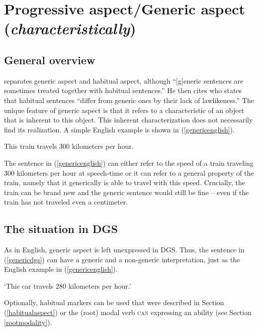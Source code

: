 \section{Progressive aspect/Generic aspect (\textit{characteristically})}\label{characteristic}
\subsection{General overview}
\citet[99]{cinque1999adverbs} separates generic aspect and habitual aspect, although ``$[$g$]$eneric sentences are sometimes treated together with habitual sentences.'' He then cites \citet[97]{dahl1985tense} who states that habitual sentences ``differ from generic ones by their lack of lawlikeness.'' The unique feature of generic aspect is that it refers to a characteristic of an object that is inherent to this object. This inherent characterization does not necessarily find its realization. A simple English example is shown in (\ref{genericenglish}).

\begin{exe}
\ex This train travels 300 kilometers per hour. \label{genericenglish}
\end{exe} 

\noindent The sentence in (\ref{genericenglish}) can either refer to the speed of a train traveling 300 kilometers per hour at speech-time or it can refer to a general property of the train, namely that it generically is able to travel with this speed. Crucially, the train can be brand new and the generic sentence would still be fine -- even if the train has not traveled even a centimeter. 

\subsection{The situation in DGS}
As in English, generic aspect is left unexpressed in DGS. Thus, the sentence in (\ref{genericdgs}) can have a generic and a non-generic interpretation, just as the English example in (\ref{genericenglish}).


\begin{exe}
\glt `This car travels 280 kilometers per hour.'\label{genericdgs}
\end{exe} 

\noindent Optionally, habitual markers can be used that were described in Section (\ref{habitualaspect}) or the (root) modal verb \textsc{can} expressing an ability (see Section \ref{rootmodality}).


